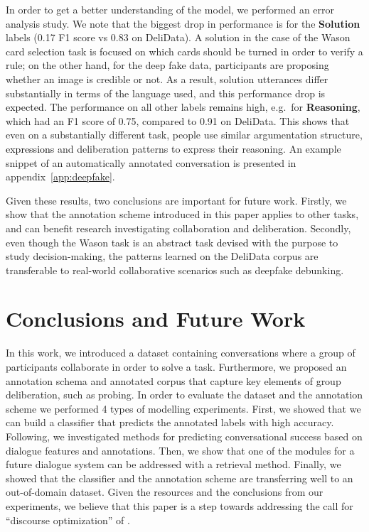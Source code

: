 \documentclass[acmsmall,manuscript,screen]{acmart}
\newcommand\newtext[1]{\textcolor{black}{#1}}
\begin{document}
In order to get a better understanding of the model, we performed an error analysis study. We note that the biggest drop in performance is for the \textbf{Solution} labels (0.17 F1 score vs 0.83 on DeliData). A solution in the case of the Wason card selection task is focused on which cards should be turned in order to verify a rule; on the other hand, for the deep fake data, participants are proposing whether an image is credible or not. As a result, solution utterances differ substantially in terms of the language used, and this performance drop is \newtext{expected}. The performance on all other labels \newtext{remains} high, e.g.\ for \textbf{Reasoning}, which had an F1 score of 0.75, compared to 0.91 on DeliData. This shows that even on \newtext{a} substantially different task, people use similar argumentation structure, \newtext{expressions}
and deliberation patterns to express their reasoning. An example snippet of an automatically annotated conversation is presented in appendix~\ref{app:deepfake}. 

Given these results, two conclusions are important for future work. Firstly, we show that the annotation scheme introduced in this paper applies to other tasks, and can benefit research investigating collaboration and deliberation. Secondly, even though the Wason task is an abstract task \newtext{devised} with the purpose to study decision-making, the patterns learned on the DeliData corpus are transferable to real-world collaborative scenarios such as deepfake debunking.

\section{Conclusions and Future Work}
\label{sec:future_work}


In this work, we introduced a dataset containing conversations where a group of participants collaborate in order to solve a task.
Furthermore, we proposed an annotation schema and annotated corpus that capture key elements of group deliberation, such as probing. 
In order to evaluate the dataset and the annotation scheme we performed 4 types of modelling experiments. First, we showed that we can build a classifier that predicts the annotated labels with high accuracy.  Following, we investigated methods for predicting conversational success based on dialogue features and annotations.  Then, we show that one of the modules for a future dialogue system can be addressed with a retrieval method. 
Finally, we showed that the classifier and the annotation scheme are transferring well to an out-of-domain dataset.
Given the resources and the conclusions from our experiments, we believe that this paper is a step towards addressing the call for ``discourse optimization'' of \citet{vecchi-etal-2021-towards}.
\end{document}
